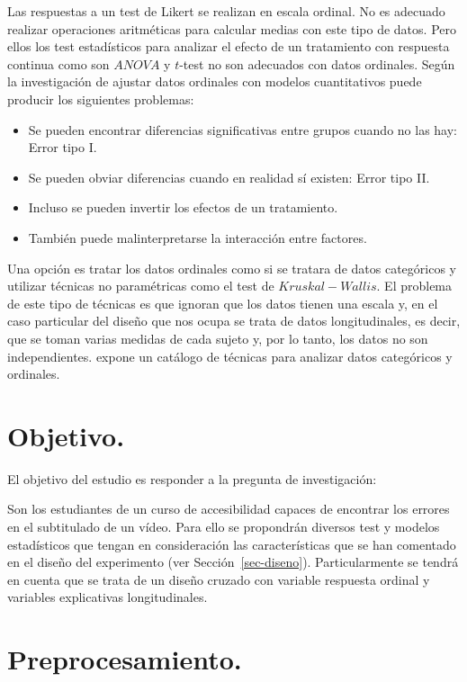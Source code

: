 \documentclass[
  12pt,
  a4paper,
  extrafontsizes,
  onecolumn,
  openright]{memoir}
\providecommand{\tightlist}{%
  \setlength{\itemsep}{0pt}\setlength{\parskip}{0pt}}\usepackage{longtable,booktabs,array}
\begin{document}
Las respuestas a un test de Likert se realizan en escala ordinal. No es
adecuado realizar operaciones aritméticas para calcular medias con este
tipo de datos. Pero ellos los test estadísticos para analizar el efecto
de un tratamiento con respuesta continua como son \(ANOVA\) y \(t\)-test
no son adecuados con datos ordinales. Según la investigación de
\textcite{kruschke2018} ajustar datos ordinales con modelos
cuantitativos puede producir los siguientes problemas:

\begin{itemize}
\tightlist
\item
  Se pueden encontrar diferencias significativas entre grupos cuando no
  las hay: Error tipo I.
\item
  Se pueden obviar diferencias cuando en realidad sí existen: Error tipo
  II.
\item
  Incluso se pueden invertir los efectos de un tratamiento.
\item
  También puede malinterpretarse la interacción entre factores.
\end{itemize}

Una opción es tratar los datos ordinales como si se tratara de datos
categóricos y utilizar técnicas no paramétricas como el test de
\(Kruskal-Wallis\). El problema de este tipo de técnicas es que ignoran
que los datos tienen una escala y, en el caso particular del diseño que
nos ocupa se trata de datos longitudinales, es decir, que se toman
varias medidas de cada sujeto y, por lo tanto, los datos no son
independientes. \textcite{agresti2010} expone un catálogo de técnicas
para analizar datos categóricos y ordinales.

\hypertarget{objetivo.}{%
\section{Objetivo.}\label{objetivo.}}

El objetivo del estudio es responder a la pregunta de investigación:

Son los estudiantes de un curso de accesibilidad capaces de encontrar
los errores en el subtitulado de un vídeo. Para ello se propondrán
diversos test y modelos estadísticos que tengan en consideración las
características que se han comentado en el diseño del experimento (ver
Sección~\ref{sec-diseno}). Particularmente se tendrá en cuenta que se
trata de un diseño cruzado con variable respuesta ordinal y variables
explicativas longitudinales.

\hypertarget{sec-preprocesado}{%
\section{Preprocesamiento.}\label{sec-preprocesado}}
\end{document}
